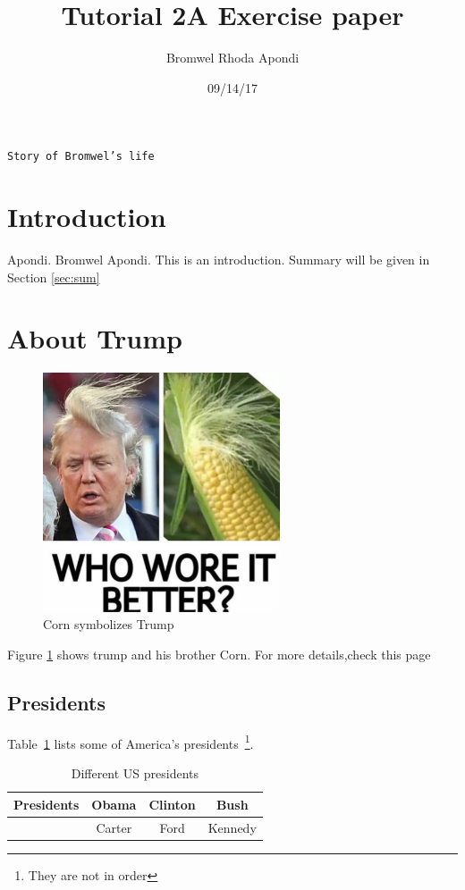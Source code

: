 \documentclass[a4paper,12pt,twoside]{article}
\author{Bromwel Rhoda Apondi}
\title{Tutorial 2A Exercise paper}
\date{09/14/17}
\begin{document}
\maketitle 
\begin{center}
 \texttt{Story of Bromwel's life}
\end{center}

\section{Introduction}
\label{sec:intro}
Apondi. Bromwel Apondi.
This is an introduction. Summary will be given in Section \ref{sec:sum}

\section{About Trump}
\label{trump}

\begin{figure}[h]
  \begin{center}
    \includegraphics[width=7cm]{trump.png}
    \caption{Corn symbolizes Trump}
    \label{fig:trump}
  \end{center}
\end{figure}

Figure \ref{fig:trump} shows trump and his brother Corn. For more details,check this page~\cite{trumpmeme}

\subsection{Presidents}
\label{sec:pres}

Table~\ref{tab:pres} lists some of America's presidents~\footnote{They are not in order}.

\begin{table}[h]
\begin{center}
 \caption{Different US presidents}
 \label{tab:pres}
\begin{tabular}{c|c|c|c} %
 \textbf{Presidents}&Obama&Clinton&Bush\\ \hline \hline
  &Carter&Ford&Kennedy\\ \hline
\end{tabular}

\end{center}

\end{table}
\end{document}
